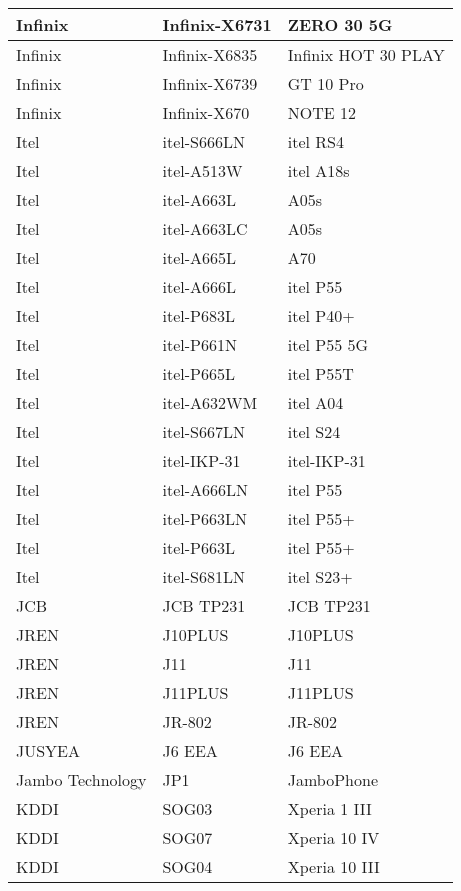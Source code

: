 \begin{tabularx}{\linewidth}{|l|X|X|}
        Infinix & Infinix-X6731 & ZERO 30 5G \\ \hline
        Infinix & Infinix-X6835 & Infinix HOT 30 PLAY \\ \hline
        Infinix & Infinix-X6739 & GT 10 Pro \\ \hline
        Infinix & Infinix-X670 & NOTE 12 \\ \hline
        Itel & itel-S666LN & itel RS4 \\ \hline
        Itel & itel-A513W & itel A18s \\ \hline
        Itel & itel-A663L & A05s \\ \hline
        Itel & itel-A663LC & A05s \\ \hline
        Itel & itel-A665L & A70 \\ \hline
        Itel & itel-A666L & itel P55 \\ \hline
        Itel & itel-P683L & itel P40+ \\ \hline
        Itel & itel-P661N & itel P55 5G \\ \hline
        Itel & itel-P665L & itel P55T \\ \hline
        Itel & itel-A632WM & itel A04 \\ \hline
        Itel & itel-S667LN & itel S24 \\ \hline
        Itel & itel-IKP-31 & itel-IKP-31 \\ \hline
        Itel & itel-A666LN & itel P55 \\ \hline
        Itel & itel-P663LN & itel P55+ \\ \hline
        Itel & itel-P663L & itel P55+ \\ \hline
        Itel & itel-S681LN & itel S23+ \\ \hline
        JCB & JCB TP231 & JCB TP231 \\ \hline
        JREN & J10PLUS & J10PLUS \\ \hline
        JREN & J11 & J11 \\ \hline
        JREN & J11PLUS & J11PLUS \\ \hline
        JREN & JR-802 & JR-802 \\ \hline
        JUSYEA & J6 EEA & J6 EEA \\ \hline
        Jambo Technology & JP1 & JamboPhone \\ \hline
        KDDI & SOG03 & Xperia 1 III \\ \hline
        KDDI & SOG07 & Xperia 10 IV \\ \hline
        KDDI & SOG04 & Xperia 10 III \\ \hline

\end{tabularx}
